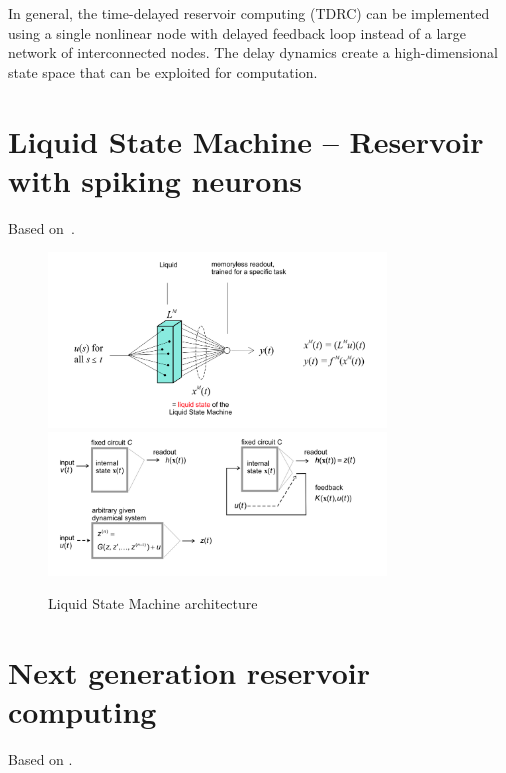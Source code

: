 \documentclass[11pt, oneside]{article}
\begin{document}
In general, the time-delayed reservoir computing (TDRC) can be implemented using a single nonlinear node with delayed feedback loop instead of a large network of interconnected nodes. The delay dynamics create a high-dimensional state space that can be exploited for computation.
\section{Liquid State Machine -- Reservoir with spiking neurons}
Based on~\cite{Maass2011, Deckers2022}.

\begin{figure}
    \centering
    \includegraphics[width=0.8\textwidth]{figs/Liquid-state.png}
    \includegraphics[width=0.8\textwidth]{figs/liquid-state-2.png}

    \caption{Liquid State Machine architecture}
    \label{fig:lsm}
\end{figure}

\section{Next generation reservoir computing}
Based on \cite{Gauthier2021}.
\end{document}
